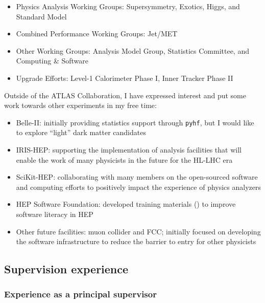\begin{itemize}
	\setlength{\itemsep}{0em}
	\item Physics Analysis Working Groups: Supersymmetry, Exotics, Higgs, and Standard Model
	\item Combined Performance Working Groups: Jet/MET
	\item Other Working Groups: Analysis Model Group, Statistics Committee, and Computing \& Software
	\item Upgrade Efforts: Level-1 Calorimeter Phase I, Inner Tracker Phase II
\end{itemize}

Outside of the ATLAS Collaboration, I have expressed interest and put some work towards other experiments in my free time:

\begin{itemize}
	\setlength{\itemsep}{0em}
	\item Belle-II: initially providing statistics support through \texttt{pyhf}, but I would like to explore \enquote{light} dark matter candidates
	\item IRIS-HEP: supporting the implementation of analysis facilities that will enable the work of many physicists in the future for the HL-LHC era
	\item SciKit-HEP: collaborating with many members on the open-sourced software and computing efforts to positively impact the experience of physics analyzers
	\item HEP Software Foundation: developed training materials () to improve software literacy in HEP
	\item Other future facilities: muon collider and FCC; initially focused on developing the software infrastructure to reduce the barrier to entry for other physicists
\end{itemize}

\subsection{Supervision experience}\label{ssec:supervision-experience}
\subsubsection{Experience as a principal supervisor \noneyet}\label{sssec:experience-as-a-principal-supervisor-noneyet}
